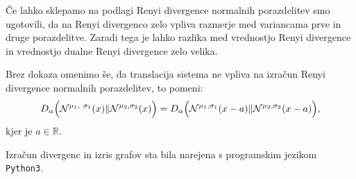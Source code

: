 Če lahko sklepamo na podlagi Renyi divergence normalnih porazdelitev smo ugotovili, da na Renyi divergenco zelo vpliva razmerje med variancama prve in druge porazdelitve. Zaradi tega je lahko razlika med vrednostjo Renyi divergence in vrednostjo dualne Renyi divergence zelo velika.

Brez dokaza omenimo še, da translacija sistema ne vpliva na izračun Renyi divergence normalnih porazdelitev, to pomeni:
\begin{equation}
	D_\alpha\Big(\N^{\mu_1, \sigma_1}(x) \| \N^{\mu_2, \sigma_2}(x)\Big) = D_\alpha\Big(\N^{\mu_1, \sigma_1}(x - a) \| \N^{\mu_2, \sigma_2}(x - a)\Big),
\end{equation}
kjer je $a \in \mathbb{R}$.

\begin{opomba}
	Izračun divergenc in izris grafov sta bila narejena s programskim jezikom \texttt{Python3}.
\end{opomba}